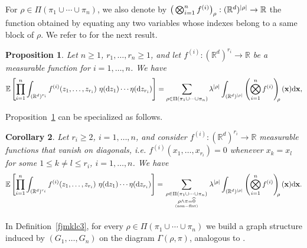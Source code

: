 \documentclass[12pt]{article}
\newcommand{\R}{\mathbb{R}}
\newcommand{\E}{\mathbb{E}}
\newtheorem{prop}{Proposition}[section]
\newtheorem{corollary}[prop]{Corollary}
\numberwithin{equation}{section}
\begin{document}
  For $\rho\in \Pi(\pi_1\cup \cdots \cup \pi_n )$, we also denote by
  $\big(
  \bigotimes_{i=1}^nf^{(i)} \big)_{\hskip-0.01cm \rho}:(\R^d)^{|\rho|}\to\R$ the function
  obtained by equating any two variables
  whose indexes belong to a same block of $\rho$.
  We refer to \cite[Theorem~3.1]{bogdan}
  for the next result.
  \begin{prop}
    \label{moment-1}
    Let $n\ge1$,
    $r_1,\ldots ,r_n\ge1$,
     and let $f^{(i)} :(\R^d)^{r_i}\to\R$ be a measurable function 
    for $i=1,\dots,n$. We have
\begin{equation}
\nonumber
\E\left[\prod_{i=1}^n
 \int_{(\R^d)^{r_i}}f^{(i)} (z_1,\dots,z_{r_i})
  \ \eta(\mathrm{d}z_1)\cdots\eta(\mathrm{d}z_{r_i}) 
\right]=\sum_{\rho\in\Pi(\pi_1\cup \cdots \cup \pi_n )}\lambda^{|\rho|}\int_{(\R^d)^{|\rho|}}\left(\bigotimes_{i=1}^n f^{(i)} \right)_{\hskip-0.1cm \rho}(\mathbf{x})\mathrm{d}\mathbf{x},
\end{equation}
\end{prop}
Proposition~\ref{moment-1} can be specialized as follows.
\begin{corollary}\label{moment-2}
  Let $r_i\ge2$, $i=1,\dots,n$, 
  and consider $f^{(i)}:(\R^d)^{r_i}\to\R$
  measurable functions that vanish on diagonals,
  i.e. $f^{(i)} (x_1,\dots,x_{r_i})=0$ whenever $x_k=x_l$ for some $1\le k\neq l\le r_i$, $i=1,\ldots , n$. We have   
\begin{equation}
  \label{fjkldf4}
  \E\left[\prod_{i=1}^n
     \int_{(\R^d)^{r_i}}f^{(i)} (z_1,\dots,z_{r_i})
  \ \eta(\mathrm{d}z_1)\cdots\eta(\mathrm{d}z_{r_i})  
\right]=
  \sum_{\substack{\rho\in\Pi ( \pi_1 \cup \cdots \cup \pi_n ) 
        \\\rho\wedge\pi=\widehat{0}} \atop {\rm (non-flat) \atop
  }}
\lambda^{|\rho|}\int_{(\R^d)^{|\rho|}}\left(\bigotimes_{i=1}^n f^{(i)} \right)_{\hskip-0.1cm \rho}(\mathbf{x})\mathrm{d}\mathbf{x}.
\end{equation}
\end{corollary}
 In Definition~\ref{fjmklc3},
 for every $\rho\in\Pi(\pi_1\cup \cdots \cup \pi_n )$
 we build a graph structure induced by
 $(G_1,\dots,G_n)$ on the diagram $\Gamma(\rho,\pi)$,
 analogous to \cite[Definition~2.3]{LiuPrivault}.
\end{document}
